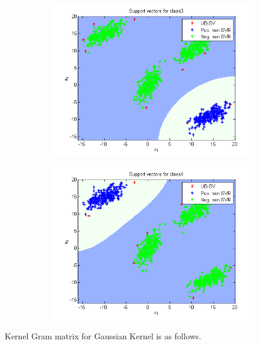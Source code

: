 \documentclass{article}
\begin{document}
\begin{figure}
\begin{subfigure}{.5\textwidth}
  \centering
  \includegraphics[width=.8\linewidth]{Classification/1a/c_g/svc3}
 
\end{subfigure}%
\begin{subfigure}{.5\textwidth}
  \centering
  \includegraphics[width=.8\linewidth]{Classification/1a/c_g/svc4}
  
\end{subfigure}
\end{figure}
Kernel Gram matrix for Gaussian Kernel is as follows.
\end{document}
